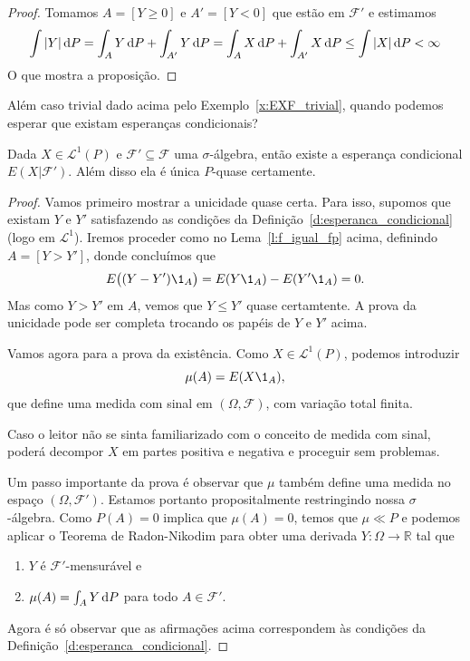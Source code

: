 \begin{proof}
  Tomamos $A = [Y \geq 0]$ e $A' = [Y < 0]$ que estão em $\mathcal{F}'$ e estimamos
  \begin{equation}
    \int |Y| \mathop{}\!\mathrm{d} P = \int_A Y \mathop{}\!\mathrm{d} P + \int_{A'} Y \mathop{}\!\mathrm{d} P = \int_A X \mathop{}\!\mathrm{d} P + \int_{A'} X \mathop{}\!\mathrm{d} P \leq \int |X| \mathop{}\!\mathrm{d} P < \infty
  \end{equation}
  O que mostra a proposição.
\end{proof}

Além caso trivial dado acima pelo Exemplo~\ref{x:EXF_trivial}, quando podemos esperar que existam esperanças condicionais?

\begin{theorem}
  Dada $X \in \mathcal{L}^1(P)$ e $\mathcal{F}' \subseteq \mathcal{F}$ uma $\sigma$-álgebra, então existe a esperança condicional $E(X|\mathcal{F}')$.
  Além disso ela é única $P$-quase certamente.
\end{theorem}

\begin{proof}
  Vamos primeiro mostrar a unicidade quase certa.
  Para isso, supomos que existam $Y$ e $Y'$ satisfazendo as condições da Definição~\ref{d:esperanca_condicional} (logo em $\mathcal{L}^1$).
  Iremos proceder como no Lema~\ref{l:f_igual_fp} acima, definindo $A = [Y > Y']$, donde concluímos que
  \begin{equation}
    E\big( (Y - Y')\1_{A} \big) = E(Y \1_{A}) - E(Y' \1_{A}) = 0.
  \end{equation}
  Mas como $Y > Y'$ em $A$, vemos que $Y \leq Y'$ quase certamtente.
  A prova da unicidade pode ser completa trocando os papéis de $Y$ e $Y'$ acima.

  Vamos agora para a prova da existência.
  Como $X \in \mathcal{L}^1(P)$, podemos introduzir
  \begin{equation}
    \mu(A) = E(X \1_{A}),
  \end{equation}
  que define uma medida com sinal em $(\Omega, \mathcal{F})$, com variação total finita.

  Caso o leitor não se sinta familiarizado com o conceito de medida com sinal, poderá decompor $X$ em partes positiva e negativa e proceguir sem problemas.

  Um passo importante da prova é observar que $\mu$ também define uma medida no espaço $(\Omega, \mathcal{F}')$.
  Estamos portanto propositalmente restringindo nossa $\sigma$-álgebra.
  Como $P(A) = 0$ implica que $\mu(A) = 0$, temos que $\mu \ll P$ e podemos aplicar o Teorema de Radon-Nikodim para obter uma derivada $Y:\Omega \to \mathbb{R}$ tal que
  \begin{enumerate}[\quad a)]
  \item $Y$ é $\mathcal{F}'$-mensurável e
  \item $\mu(A) = \int_A Y \mathop{}\!\mathrm{d} P$ para todo $A \in \mathcal{F}'$.
  \end{enumerate}
  Agora é só observar que as afirmações acima correspondem às condições da Definição~\ref{d:esperanca_condicional}.
\end{proof}

